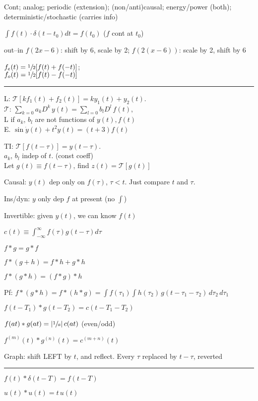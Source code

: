 \documentclass[4pt]{article}
\theoremstyle{definition}
\theoremstyle{definition}
\begin{document}
    Cont; 
    analog; 
    periodic (extension); 
    (non/anti)causal; 
    energy/power (both); 
    deterministic/stochastic (carries info)

    $\int f(t)\cdot \delta(t - t_0) dt = f(t_0)$ ($f$ cont at $t_0$)
    

    out--in  $f(2x-6)$: shift by 6, scale by 2; $f(2(x-6))$: scale by 2, shift by 6

    $f_e(t) = \sfrac{1}{2}[f(t) + f(-t)]$; \\
    $f_o(t) = \sfrac{1}{2}[f(t) - f(-t)]$
\rule{\linewidth}{0.5pt}
    L: $\mathcal{T}[kf_1(t) + f_2(t)] = ky_1(t) + y_2(t)$.\\
    $\mathcal{T}$: $\sum_{k=0}a_k D^k \, y(t) = \sum_{l=0}b_lD^l\, f(t)$,\\
    L if $a_k$, $b_l$ are not functions of $y(t), f(t)$\\
    E. $\sin\dot{y}(t) + t^2 y(t) = (t+3) f(t)$
    
    TI: $\mathcal{T}[f(t-\tau)] = y(t-\tau)$.\\
    $a_k$, $b_l$ indep of $t$. (const coeff)\\
    Let $g(t)\equiv f(t-\tau)$, find $z(t) = \mathcal{T}[g(t)]$


    Causal: $y(t)$ dep only on $f(\tau)$, $\tau < t$. 
    Just compare $t$ and $\tau$.
    
    Ins/dyn: $y$ only dep $f$ at present (no $\int$)
    
    Invertible: given $y(t)$, we can know $f(t)$

    $c(t) \equiv \int_{-\infty}^{\infty} f(\tau) g(t-\tau) d\tau$

    $f * g = g * f$
    
    $f * (g + h) = f * h + g * h$
    
    $f * (g * h) = (f * g) * h$

        Pf: $f * (g * h) = f * (h * g) = \int f(\tau_1) \int h(\tau_2)\, g(t - \tau_1 - \tau_2) \, d\tau_2 \, d\tau_1$
    
     $f(t - T_1) * g(t - T_2) = c(t - T_1 - T_2)$

     $f(at) * g(at) = |\sfrac{1}{a}|\, c(at)$ (even/odd)

     $f^{(m)} (t) * g^{(n)} (t) = c^{(m+n)}(t)$


    Graph: shift LEFT by $t$, and reflect. Every $\tau$ replaced by $t-\tau$, reverted
\rule{\linewidth}{0.5pt}
    $f(t) * \delta(t-T) = f(t-T)$
    
    $u(t) * u(t) = t \, u(t)$
\end{document}

